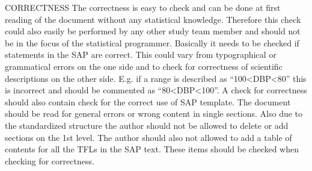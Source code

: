 CORRECTNESS
The correctness is easy to check and can be done at first reading of the document without any statistical knowledge. Therefore this check could also easily be performed by any other study team member and should not be in the focus of the statistical programmer. Basically it needs to be checked if statements in the SAP are correct. This could vary from typographical or grammatical errors on the one side and to check for correctness of scientific descriptions on the other side. E.g. if a range is described as “100<DBP<80” this is incorrect and should be commented as “80<DBP<100”. A check for correctness should also contain check for the correct use of SAP template. The document should be read for general errors or wrong content in single sections. Also due to the standardized structure the author should not be allowed to delete or add sections on the 1st level. The author should also not allowed to add a table of contents for all the TFLs in the SAP text. These items should be checked when checking for correctness.

